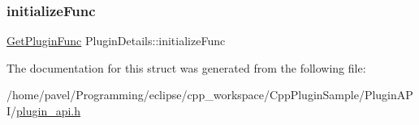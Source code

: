 \subsubsection{\texorpdfstring{initialize\+Func}{initializeFunc}}
{\footnotesize\ttfamily \hyperlink{plugin__api_8h_ad9875bfebc4c7cc82c302b2a164de423}{Get\+Plugin\+Func} Plugin\+Details\+::initialize\+Func}



The documentation for this struct was generated from the following file\+:\begin{DoxyCompactItemize}
\item 
/home/pavel/\+Programming/eclipse/cpp\+\_\+workspace/\+Cpp\+Plugin\+Sample/\+Plugin\+A\+P\+I/\hyperlink{plugin__api_8h}{plugin\+\_\+api.\+h}\end{DoxyCompactItemize}

